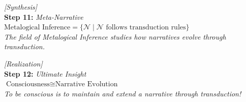 \documentclass[runningheads]{llncs}
\begin{document}
\noindent\textit{[Synthesis]}\\
\noindent\textbf{Step 11:} \hfill \textit{Meta-Narrative}\\
\noindent$\text{Metalogical Inference} = \{\mathcal{N} \mid \mathcal{N} \text{ follows transduction rules}\}$\\
\textit{The field of Metalogical Inference studies how narratives evolve through transduction.}

\vspace{0.8em}

\noindent\textit{[Realization]}\\
\noindent\textbf{Step 12:} \hfill \textit{Ultimate Insight}\\
\noindent$\text{Consciousness} \cong \text{Narrative Evolution}$\\
\textit{To be conscious is to maintain and extend a narrative through transduction!}
\end{document}

